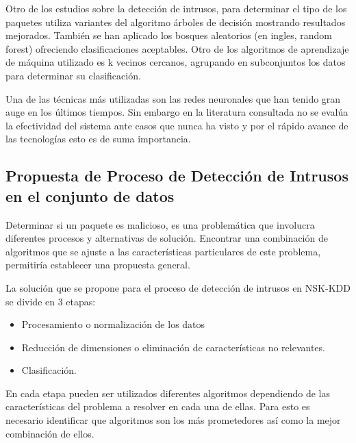 Otro de los estudios sobre la detección de intrusos, para determinar el tipo de los paquetes utiliza variantes del algoritmo árboles de decisión mostrando resultados mejorados. También se han aplicado los bosques aleatorios (en ingles, random forest) ofreciendo clasificaciones aceptables. Otro de los algoritmos de aprendizaje de máquina utilizado es k vecinos cercanos, agrupando en subconjuntos los datos para determinar su clasificación.

Una de las técnicas más utilizadas son las redes neuronales que han tenido gran auge en los últimos tiempos. Sin embargo en la literatura consultada no se evalúa la efectividad del sistema ante casos que nunca ha visto y por el rápido avance de las tecnologías esto es de suma importancia.

\subsection{Propuesta de Proceso de Detección de Intrusos en el conjunto de datos}
Determinar si un paquete es malicioso, es una problemática que involucra diferentes procesos y alternativas de solución. Encontrar una combinación de algoritmos que se ajuste a las características particulares de este problema, permitiría establecer una propuesta general.

La solución que se propone para el proceso de detección de intrusos en NSK-KDD se divide en 3 etapas:

\begin{itemize}
    \item Procesamiento o normalización de los datos
    \item Reducción de dimensiones o eliminación de características no relevantes.
    \item Clasificación.
\end{itemize}

En cada etapa pueden ser utilizados diferentes algoritmos dependiendo de las características del problema a resolver en cada una de ellas. Para esto es necesario identificar que algoritmos son los más prometedores así como la mejor combinación de ellos.